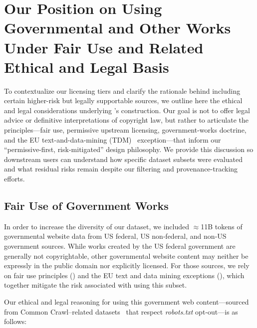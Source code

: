 
\section{Our Position on Using Governmental and Other Works Under Fair Use and Related Ethical and Legal Basis}
\label{app:govt_works}

To contextualize our licensing tiers and clarify the rationale behind including certain higher-risk but legally supportable sources, we outline here the ethical and legal considerations underlying \MixtureVitae{}’s construction. Our goal is not to offer legal advice or definitive interpretations of copyright law, but rather to articulate the principles—fair use, permissive upstream licensing, government-works doctrine, and the EU text-and-data-mining (TDM)~\citep{eu_directive_tdm_2019,10.1093/grurint/ikac054} exception—that inform our “permissive-first, risk-mitigated” design philosophy. We provide this discussion so downstream users can understand how specific dataset subsets were evaluated and what residual risks remain despite our filtering and provenance-tracking efforts.

\subsection{Fair Use of Government Works}
In order to increase the diversity of our dataset, we included $\approx$11B tokens of governmental website data from US federal, US non‑federal, and non‑US government sources. While works created by the US federal government are generally not copyrightable, other governmental website content may neither be expressly in the public domain nor explicitly licensed. For those sources, we rely on fair use principles (\cite{uscopyright,lemley2017fair}) and the EU text and data mining exceptions (\cite{eu_directive_tdm_2019, 10.1093/grurint/ikac054}), which together mitigate the risk associated with using this subset.

Our ethical and legal reasoning for using this government web content---sourced from Common Crawl–related datasets~\citep{commoncrawl} that respect \textit{robots.txt} opt‑out---is as follows:


